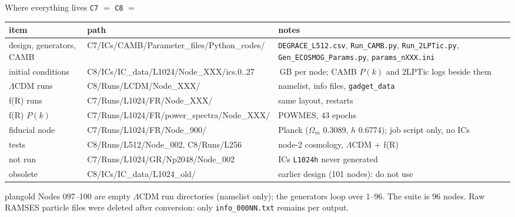 \documentclass[UTF8]{beamer}
\begin{document}
\begin{frame}{Where everything lives}
  \scriptsize
  \texttt{C7} $=$  \quad
  \texttt{C8} $=$ 
  \par\smallskip
  \setlength{\tabcolsep}{4pt}
  \begin{tabular}{@{}l>{\ttfamily}p{}>{\raggedright\arraybackslash}p{}@{}}
    \toprule
    item & \normalfont path & notes \\
    \midrule
    design, generators, CAMB & C7/ICs/CAMB/Parameter\_files/Python\_codes/ & \texttt{DEGRACE\_L512.csv}, \texttt{Run\_CAMB.py}, \texttt{Run\_2LPTic.py}, \texttt{Gen\_ECOSMOG\_Params.py}, \texttt{params\_nXXX.ini} \\
    initial conditions & C8/ICs/IC\_data/L1024/Node\_XXX/ics.0..27 & 30\,GB per node; CAMB $P(k)$ and 2LPTic logs beside them \\
    $\Lambda$CDM runs & C8/Runs/LCDM/Node\_XXX/ & namelist, info files, \texttt{gadget\_data} \\
    f(R) runs & C7/Runs/L1024/FR/Node\_XXX/ & same layout, restarts \\
    f(R) $P(k)$ & C7/Runs/L1024/FR/power\_spectra/Node\_XXX/ & POWMES, 43 epochs \\
    fiducial node & C7/Runs/L1024/FR/Node\_900/ & Planck ($\Omega_m$ 0.3089, $h$ 0.6774); job script only, no ICs \\
    tests & C8/Runs/L512/Node\_002, C8/Runs/L256 & node-2 cosmology, $\Lambda$CDM + f(R) \\
    not run & C7/Runs/L1024/GR/Np2048/Node\_002 & ICs \texttt{L1024h} never generated \\
    obsolete & C8/ICs/IC\_data/L1024\_old/ & earlier design (101 nodes): do not use \\
    \bottomrule
  \end{tabular}

  \vspace{1ex}
  \begin{phasebox}[colback=planpale,top=0.8mm,bottom=0.8mm]{plangold}
    Nodes 097--100 are empty $\Lambda$CDM run directories (namelist only); the generators loop over 1--96. The suite is 96 nodes.
    Raw RAMSES particle files were deleted after conversion: only \texttt{info\_000NN.txt} remains per output.
  \end{phasebox}
\end{frame}
\end{document}
